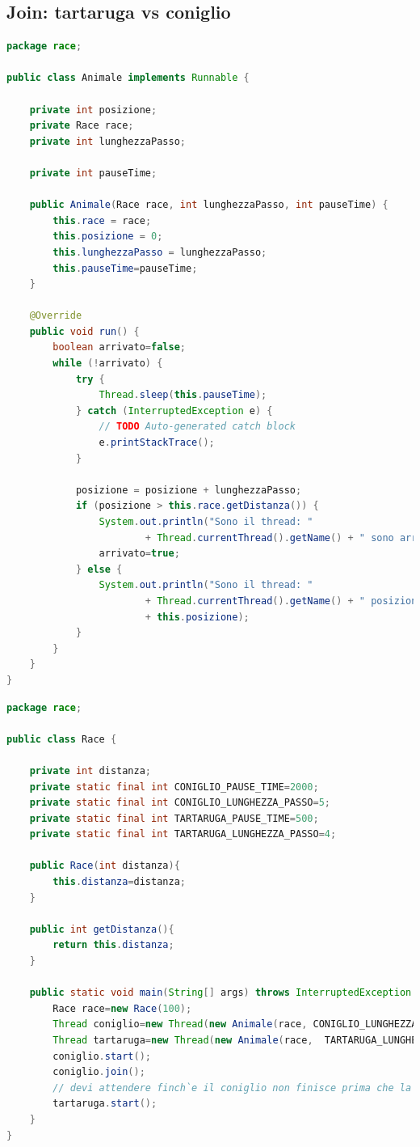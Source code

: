 \documentclass{article}
\begin{document}
\subsection{Join: tartaruga vs coniglio}
\begin{lstlisting}[language=Java]
package race;

public class Animale implements Runnable {

	private int posizione;
	private Race race;
	private int lunghezzaPasso;
	
	private int pauseTime;

	public Animale(Race race, int lunghezzaPasso, int pauseTime) {
		this.race = race;
		this.posizione = 0;
		this.lunghezzaPasso = lunghezzaPasso;
		this.pauseTime=pauseTime;
	}

	@Override
	public void run() {
		boolean arrivato=false;
		while (!arrivato) {
			try {
				Thread.sleep(this.pauseTime);
			} catch (InterruptedException e) {
				// TODO Auto-generated catch block
				e.printStackTrace();
			}
			
			posizione = posizione + lunghezzaPasso;
			if (posizione > this.race.getDistanza()) {
				System.out.println("Sono il thread: "
						+ Thread.currentThread().getName() + " sono arrivato");
				arrivato=true;
			} else {
				System.out.println("Sono il thread: "
						+ Thread.currentThread().getName() + " posizione "
						+ this.posizione);
			}
		}
	}
}
\end{lstlisting}

\begin{lstlisting}[language=Java]
package race;

public class Race {
	
	private int distanza;
	private static final int CONIGLIO_PAUSE_TIME=2000;
	private static final int CONIGLIO_LUNGHEZZA_PASSO=5;
	private static final int TARTARUGA_PAUSE_TIME=500;
	private static final int TARTARUGA_LUNGHEZZA_PASSO=4;
	
	public Race(int distanza){
		this.distanza=distanza;
	}
	
	public int getDistanza(){
		return this.distanza;
	}
	
	public static void main(String[] args) throws InterruptedException {
		Race race=new Race(100);
		Thread coniglio=new Thread(new Animale(race, CONIGLIO_LUNGHEZZA_PASSO, CONIGLIO_PAUSE_TIME), "CONIGLIO");
		Thread tartaruga=new Thread(new Animale(race,  TARTARUGA_LUNGHEZZA_PASSO, TARTARUGA_LUNGHEZZA_PASSO), "TARTARUGA");
		coniglio.start();
		coniglio.join();
		// devi attendere finch`e il coniglio non finisce prima che la tartaruga parta
		tartaruga.start();
	}
}
\end{lstlisting}
\end{document}
